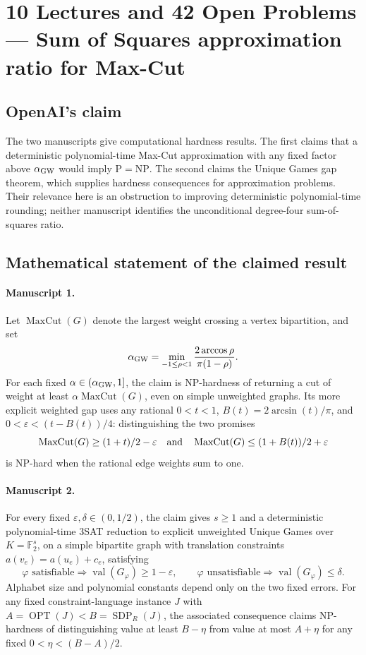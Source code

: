 \documentclass[11pt]{article}
\begin{document}
\section*{10 Lectures and 42 Open Problems — Sum of Squares approximation ratio for Max-Cut}

\subsection{OpenAI's claim}
The two manuscripts give computational hardness results. The first claims that a deterministic polynomial-time Max-Cut approximation with any fixed factor above $\alpha_{\rm GW}$ would imply $\mathrm P=\mathrm{NP}$. The second claims the Unique Games gap theorem, which supplies hardness consequences for approximation problems. Their relevance here is an obstruction to improving deterministic polynomial-time rounding; neither manuscript identifies the unconditional degree-four sum-of-squares ratio.

\subsection{Mathematical statement of the claimed result}
\paragraph{Manuscript 1.}
Let $\operatorname{MaxCut}(G)$ denote the largest weight crossing a vertex bipartition, and set
\[
 \alpha_{\rm GW}=\min_{-1\le\rho<1}\frac{2\arccos\rho}{\pi(1-\rho)}.
\]
For each fixed $\alpha\in(\alpha_{\rm GW},1]$, the claim is NP-hardness of returning a cut of weight at least $\alpha\operatorname{MaxCut}(G)$, even on simple unweighted graphs. Its more explicit weighted gap uses any rational $0<t<1$, $B(t)=2\arcsin(t)/\pi$, and $0<\varepsilon<(t-B(t))/4$: distinguishing the two promises
\[
 \operatorname{MaxCut}(G)\ge(1+t)/2-\varepsilon
 \quad\hbox{and}\quad
 \operatorname{MaxCut}(G)\le(1+B(t))/2+\varepsilon
\]
is NP-hard when the rational edge weights sum to one.

\paragraph{Manuscript 2.}
For every fixed $\varepsilon,\delta\in(0,1/2)$, the claim gives $s\ge1$ and a deterministic polynomial-time $3$SAT reduction to explicit unweighted Unique Games over $K=\mathbb F_2^s$, on a simple bipartite graph with translation constraints $a(v_e)=a(u_e)+c_e$, satisfying
\[
 \varphi\text{ satisfiable}\Rightarrow\operatorname{val}(G_{\varphi})\ge1-\varepsilon,
 \qquad\varphi\text{ unsatisfiable}\Rightarrow\operatorname{val}(G_{\varphi})\le\delta.
\]
Alphabet size and polynomial constants depend only on the two fixed errors. For any fixed constraint-language instance $J$ with $A=\operatorname{OPT}(J)<B=\operatorname{SDP}_{R}(J)$, the associated consequence claims NP-hardness of distinguishing value at least $B-\eta$ from value at most $A+\eta$ for any fixed $0<\eta<(B-A)/2$.
\end{document}
